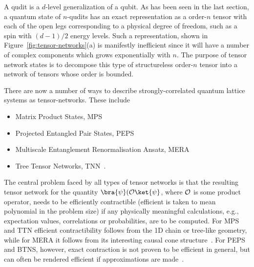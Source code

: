 A qudit is a $d$-level generalization of a qubit.  As has been seen in the last section, a quantum state of $n$-qudits has an exact representation as a order-$n$ tensor with each of the open legs corresponding to a physical degree of freedom, such
as a spin with $(d-1)/2$ energy levels. Such a representation, shown in
Figure~\ref{fig:tensor-networks}(a) is manifestly inefficient since it will have a
number of complex components which grows exponentially with $n$. The purpose of
tensor network states is to decompose this type of structureless order-$n$ tensor into
a network of tensors whose order is bounded.  


There are now a number of ways to
describe strongly-correlated quantum lattice systems as 
tensor-networks. These include
\begin{itemize}
 \item[(i)] Matrix Product States, MPS~\cite{ostromm1995,fannesnachtwern1992,2010NJPh...12b5005C}
 \item[(ii)] Projected Entangled Pair States, PEPS~\cite{verstraete08,TNSreview09}
 \item[(iii)] Multiscale Entanglement Renormalisation Ansatz, MERA~\cite{vidal2007, 2009arXiv0912.1651V}
 \item[(iv)] Tree Tensor Networks, TNN~\cite{PhysRevA.74.022320,2009PhRvB..80w5127T}. 
\end{itemize}

 The central problem faced by all types of tensor networks is that the
resulting tensor network for the quantity $\bra{\psi}(\2 O\ket{\psi}$, where ${\cal O}$
is some product operator, needs to be efficiently contractible (efficient is taken to mean polynomial in the problem size) if any physically meaningful calculations, e.g., expectation values, correlations or probabilities, are to be
computed. For MPS and TTN efficient contractibility follows from the 1D chain or tree-like geometry, while for MERA it follows from its interesting causal cone structure~\cite{2009arXiv0912.1651V}. For PEPS and BTNS, however, exact contraction is not proven to be efficient in general, but can often be rendered efficient if approximations are made~\cite{verstraete08,TNSreview09}.


